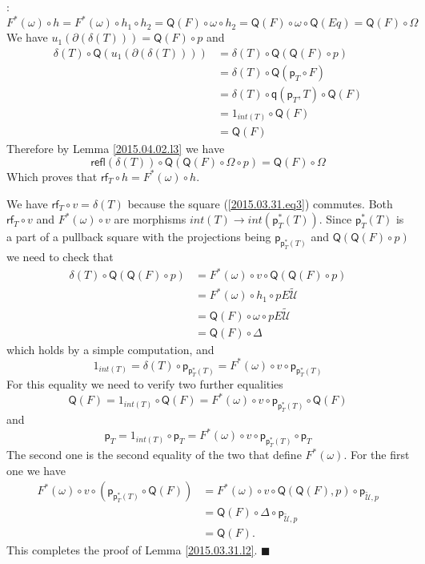 \documentclass[12pt]{article}
\numberwithin{equation}{section}
\newenvironment{myproof}{{\bf Proof}:}{$\blacksquare$ \vskip 5mm }
\newcommand{\sr}{\rightarrow}
\newcommand{\wt}{\widetilde}
\newcommand{\id}{1}            %
\newcommand{\p}{\mathsf{p}}
\newcommand{\q}{\mathsf{q}}
\newcommand{\refl}{\mathsf{refl}}
\newcommand{\U}{\mathcal{U}}
\newcommand{\rf}{\mathsf{rf}}
\newcommand{\Q}{\mathsf{Q}}
\begin{document}
\begin{myproof}
%
$$F^*(\omega)\circ h=F^*(\omega)\circ h_1\circ h_2=\Q(F)\circ \omega\circ
h_2=\Q(F)\circ \omega\circ \Q(Eq)=\Q(F)\circ \Omega$$
%
We have $u_1(\partial(\delta(T)))=\Q(F)\circ p$ and
%
\begin{align*}
  \delta(T)\circ \Q(u_1(\partial(\delta(T))))
    & = \delta(T)\circ \Q(\Q(F)\circ p) \\
    & =  \delta(T)\circ \Q(\p_T\circ F) \\
    & = \delta(T)\circ \q(\p_T,T)\circ \Q(F) \\
    & = \id_{int(T)}\circ \Q(F) \\
    & = \Q(F)
\end{align*}
%
Therefore by Lemma \ref{2015.04.02.l3} we have
%
$$\refl(\delta(T))\circ \Q(\Q(F)\circ \Omega\circ p)=\Q(F)\circ \Omega$$
%
Which proves that $\rf_T\circ h=F^*(\omega)\circ h$.

We have $\rf_T\circ v=\delta(T)$ because the square (\ref{2015.03.31.eq3})
commutes.  Both $\rf_T\circ v$ and $F^*(\omega)\circ v$ are morphisms $int(T)\sr
int(\p_T^*(T))$. Since $\p_T^*(T)$ is a part of a pullback square with the
projections being $\p_{\p_T^*(T)}$ and $\Q(\Q(F)\circ p)$ we need to check that
%
\begin{align*}
  \delta(T)\circ \Q(\Q(F)\circ p)
    & = F^*(\omega)\circ v\circ \Q(\Q(F)\circ p) \\
    & = F^*(\omega)\circ h_1\circ pE\wt{\U} \\
    & = \Q(F)\circ \omega \circ pE\wt{\U} \\
    & = \Q(F)\circ \Delta
\end{align*}
%
which holds by a simple computation, and
%
$$\id_{int(T)}=\delta(T)\circ \p_{\p_T^*(T)}=F^*(\omega)\circ v\circ
\p_{\p_T^*(T)}$$
%
For this equality we need to verify two further equalities
%
$$\Q(F)=\id_{int(T)}\circ \Q(F)=F^*(\omega)\circ v\circ \p_{\p_T^*(T)}\circ \Q(F)$$
%
and
%
$$\p_T=\id_{int(T)}\circ \p_T=F^*(\omega)\circ v\circ \p_{\p_T^*(T)}\circ \p_T$$
%
The second one is the second equality of the two that define $F^*(\omega)$. For
the first one we have
%
\begin{align*}
  F^*(\omega)\circ v\circ (\p_{\p_T^*(T)}\circ \Q(F))
    & = F^*(\omega)\circ v\circ \Q(\Q(F),p)\circ \p_{\wt{\U},p} \\
    & = \Q(F)\circ \Delta\circ \p_{\wt{\U},p} \\
    & = \Q(F).
\end{align*}
%
This completes the proof of Lemma \ref{2015.03.31.l2}.
\end{myproof}
%
 
\end{document}

